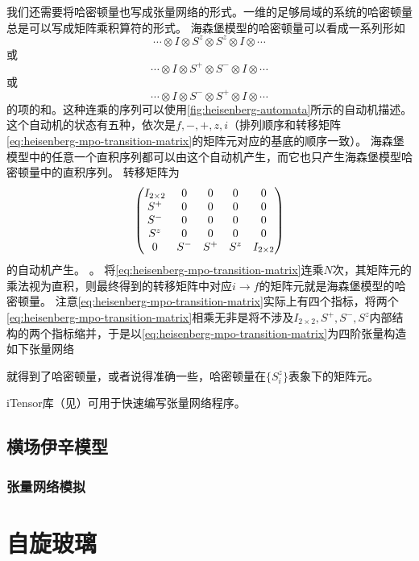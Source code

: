 我们还需要将哈密顿量也写成张量网络的形式。一维的足够局域的系统的哈密顿量总是可以写成矩阵乘积算符的形式。
海森堡模型的哈密顿量可以看成一系列形如
\[
    \cdots \otimes I \otimes S^z \otimes S^z \otimes I \otimes \cdots
\]
或
\[
    \cdots \otimes I \otimes S^+ \otimes S^- \otimes I \otimes \cdots
\]
或
\[
    \cdots \otimes I \otimes S^- \otimes S^+ \otimes I \otimes \cdots
\]
的项的和。这种连乘的序列可以使用\autoref{fig:heisenberg-automata}所示的自动机描述。
这个自动机的状态有五种，依次是$f, -, +, z, i$（排列顺序和转移矩阵\eqref{eq:heisenberg-mpo-transition-matrix}的矩阵元对应的基底的顺序一致）。
海森堡模型中的任意一个直积序列都可以由这个自动机产生，而它也只产生海森堡模型哈密顿量中的直积序列。
转移矩阵为
\begin{equation}
    \pmqty{
        I_{2 \times 2} & 0 & 0 & 0 & 0 \\
        S^+ & 0 & 0 & 0 & 0 \\
        S^- & 0 & 0 & 0 & 0 \\
        S^z & 0 & 0 & 0 & 0 \\
        0 & S^- & S^+ & S^z & I_{2 \times 2}
    }
    \label{eq:heisenberg-mpo-transition-matrix}
\end{equation}
的自动机产生。
。
将\eqref{eq:heisenberg-mpo-transition-matrix}连乘$N$次，其矩阵元的乘法视为直积，则最终得到的转移矩阵中对应$i \to f$的矩阵元就是海森堡模型的哈密顿量。
注意\eqref{eq:heisenberg-mpo-transition-matrix}实际上有四个指标，将两个\eqref{eq:heisenberg-mpo-transition-matrix}相乘无非是将不涉及$I_{2 \times 2}, S^+, S^-, S^z$内部结构的两个指标缩并，于是以\eqref{eq:heisenberg-mpo-transition-matrix}为四阶张量构造如下张量网络

就得到了哈密顿量，或者说得准确一些，哈密顿量在$\{S^z_i\}$表象下的矩阵元。

iTensor库（见\cite{itensor}）可用于快速编写张量网络程序。

\section{横场伊辛模型}

\subsection{张量网络模拟}

\chapter{自旋玻璃}
